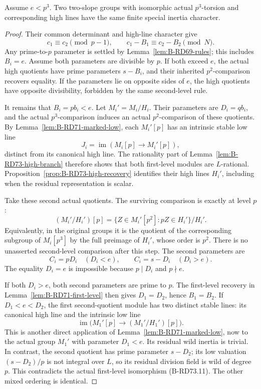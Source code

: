 \begin{lemma}
\label{lem:B-RD73-common-high}
Assume \(e<p^3\). Two two-slope groups with isomorphic actual
\(p^3\)-torsion and corresponding high lines have the same
finite special inertia character.
\end{lemma}
\begin{proof}
Their common determinant and high-line character give
\[
 c_1\equiv c_2\pmod{p-1},\qquad
 c_1-B_1\equiv c_2-B_2\pmod N.
 \tag{B-RD73.10}
\]
Any prime-to-\(p\) parameter is settled by
Lemma~\ref{lem:B-RD69-rules}; this includes \(B_i=e\).
Assume both parameters are divisible by \(p\).
If both exceed \(e\), the actual high quotients have prime
parameters \(s-B_i\), and their inherited \(p^2\)-comparison
recovers equality. If the parameters lie on opposite sides of
\(e\), the high quotients have opposite divisibility, forbidden
by the same second-level rule.

It remains that \(B_i=pb_i<e\). Let \(M_i'=M_i/H_i\).
Their parameters are \(D_i=q b_i\), and the actual
\(p^3\)-comparison induces an actual \(p^2\)-comparison of
these quotients. By Lemma~\ref{lem:B-RD71-marked-low}, each
\(M_i'[p]\) has an intrinsic stable low line
\[
 J_i=\operatorname{im}(M_i[p]\longrightarrow M_i'[p]),
\]
distinct from its canonical high line. The rationality part of
Lemma~\ref{lem:B-RD73-high-branch} therefore shows that both
first-level modules are \(L\)-rational.
Proposition~\ref{prop:B-RD73-high-recovery} identifies their
high lines \(H_i'\), including when the residual representation
is scalar.

Take these second actual quotients. The surviving comparison
is exactly at level \(p\):
\[
 (M_i'/H_i')[p]
   =\{Z\in M_i'[p^2]:pZ\in H_i'\}/H_i'.
 \tag{B-RD73.11}
\]
Equivalently, in the original groups it is the quotient of
the corresponding subgroup of \(M_i[p^3]\) by the full
preimage of \(H_i'\), whose order is \(p^2\).
There is no unasserted second-level comparison after this step.
The second parameters are
\[
 C_i=pD_i\quad(D_i<e),\qquad
 C_i=s-D_i\quad(D_i>e).
 \tag{B-RD73.12}
\]
The equality \(D_i=e\) is impossible because \(p\mid D_i\)
and \(p\nmid e\).

If both \(D_i>e\), both second parameters are prime to \(p\).
The first-level recovery in Lemma~\ref{lem:B-RD71-first-level}
then gives \(D_1=D_2\), hence \(B_1=B_2\).
If \(D_1<e<D_2\), the first second-quotient module has two
distinct stable lines: its canonical high line and the
intrinsic low line
\[
 \operatorname{im}\bigl(M_1'[p]\longrightarrow(M_1'/H_1')[p]\bigr).
 \tag{B-RD73.13}
\]
This is another direct application of
Lemma~\ref{lem:B-RD71-marked-low}, now to the actual group
\(M_1'\) with parameter \(D_1<e\).
Its residual wild inertia is trivial. In contrast, the second
quotient has prime parameter \(s-D_2\); its low valuation
\((s-D_2)/p\) is not integral over \(L\), so its residual
division field is wild of degree \(p\). This contradicts the
actual first-level isomorphism (B-RD73.11).
The other mixed ordering is identical.


\end{proof}
